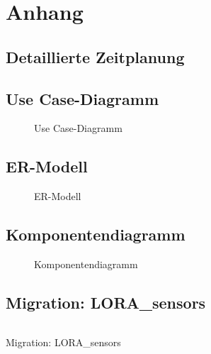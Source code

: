 \section{Anhang}
\subsection{Detaillierte Zeitplanung}
\label{app:Zeitplanung}



\clearpage


\subsection{Use Case-Diagramm}
\label{app:UseCase}
\begin{figure}[htb]
\centering
{}
\caption{Use Case-Diagramm}
\end{figure}
\clearpage


\clearpage


\clearpage

\subsection{ER-Modell}
\label{app:ERM}
\begin{figure}[htb]
\centering
{}
\caption{ER-Modell}
\end{figure}

\subsection{Komponentendiagramm}
\label{app:KomponentenSystem}
\begin{figure}[htb]
\centering
{}
\caption{Komponentendiagramm}
\end{figure}
\clearpage



\clearpage
\subsection{Migration: LORA\_sensors}
\label{app:Migration}
\begin{longlisting}
  \inputminted{php}{Listings/migration.php}
  \caption{Migration: LORA\_sensors}
\end{longlisting}

